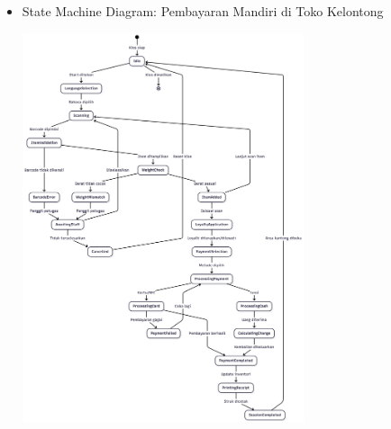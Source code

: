 \documentclass[a4paper]{article}
\begin{document}
\begin{enumerate}[itemsep=1em]
  \pagebreak

  \begin{itemize}[itemsep=1em]
    \item State Machine Diagram: Pembayaran Mandiri di Toko Kelontong
    \begin{center}
      \includegraphics[width=0.65\textwidth,keepaspectratio]{self-checkout-state-diagram.png}
    \end{center}
  \end{itemize}
  
  \pagebreak
  

\end{enumerate}
\end{document}
